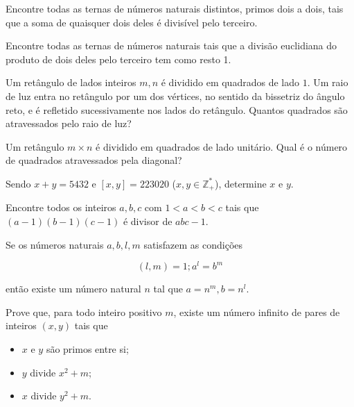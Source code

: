 \begin{questao}
  Encontre todas as ternas de números naturais distintos, primos dois a dois,
  tais que a soma de quaisquer dois deles é divisível pelo terceiro.
\end{questao}

\begin{questao}
  Encontre todas as ternas de números naturais tais que a divisão
  euclidiana do produto de dois deles pelo terceiro tem como resto 1.
\end{questao}

\begin{questao}
  Um retângulo de lados inteiros $m,n$ é dividido em quadrados de lado
  $1$. Um raio de luz entra no retângulo por um dos vértices, no
  sentido da bissetriz do ângulo reto, e é refletido sucessivamente nos
  lados do retângulo. Quantos quadrados são atravessados pelo raio de
  luz?
\end{questao}

\begin{questao}
  Um retângulo $m \times n$ é dividido em quadrados de lado
  unitário. Qual é o número de quadrados atravessados pela diagonal?
\end{questao}

\begin{questao}
  Sendo $x+y=5432$ e $[x,y]=223020$ ($x,y \in \mathbb{Z}^{*}_{+}$), determine $x$ e $y$.
\end{questao}

\begin{questao}
  Encontre todos os inteiros $a,b,c$ com $1 < a < b < c$ tais que
  $(a-1)(b-1)(c-1)$ é divisor de $abc-1$.
\end{questao}

\begin{questao}
  Se os números naturais $a,b,l,m$ satisfazem as condições

  $$ (l,m)=1; a^l=b^m $$

  então existe um número natural $n$ tal que $a=n^m, b=n^l$.
\end{questao}

\begin{questao}
  Prove que, para todo inteiro positivo $m$, existe um número infinito
  de pares de inteiros $(x,y)$ tais que 

  \begin{itemize}[itemsep=1ex, leftmargin=1cm]
    \item $x$ e $y$ são primos entre si;
    \item $y$ divide $x^2+m$;
    \item $x$ divide $y^2+m$.
  \end{itemize}
\end{questao}

